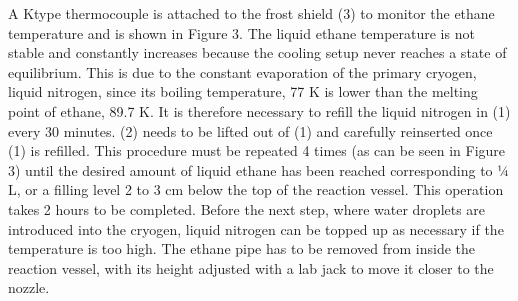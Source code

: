 \documentclass[letterpaper,10pt,english]{jupyterBook}
\begin{document}
\sphinxAtStartPar
A K\sphinxhyphen{}type thermocouple is attached to the frost shield (3) to monitor the ethane temperature and is shown in Figure 3. The liquid ethane temperature is not stable and constantly increases because the cooling setup never reaches a state of equilibrium. This is due to the constant evaporation of the primary cryogen, liquid nitrogen, since its boiling temperature, 77 K is lower than the melting point of ethane, 89.7 K. It is therefore necessary to refill the liquid nitrogen in (1) every 30 minutes. (2) needs to be lifted out of (1) and carefully re\sphinxhyphen{}inserted once (1) is refilled. This procedure must be repeated 4 times (as can be seen in Figure 3) until the desired amount of liquid ethane has been reached corresponding to ¼ L, or a filling level 2 to 3 cm below the top of the reaction vessel. This operation takes 2 hours to be completed. Before the next step, where water droplets are introduced into the cryogen, liquid nitrogen can be topped up as necessary if the temperature is too high. The ethane pipe has to be removed from inside the reaction vessel, with its height adjusted with a lab jack to move it closer to the nozzle.
\end{document}
